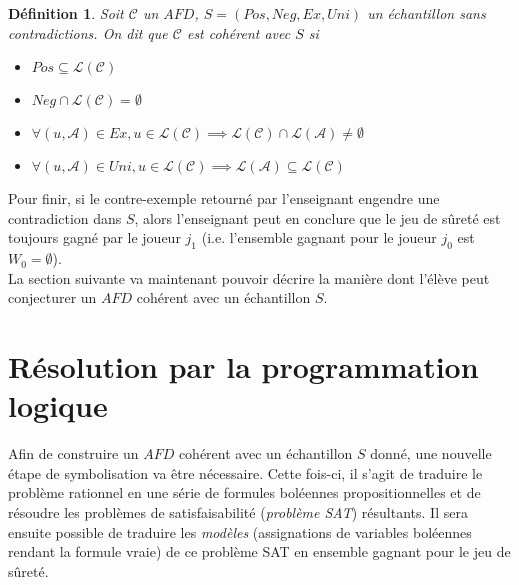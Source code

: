 \documentclass[12pt,a4paper,oneside,titlepage]{report}
\newtheorem{defi}{D\'efinition}[section]
\begin{document}
\begin{defi}
\label{consistency}
Soit $\mathcal{C}$ un $AFD$, $S=(Pos, Neg, Ex, Uni)$ un échantillon sans contradictions. On dit que $\mathcal{C}$ est \emph{cohérent} avec $S$ si
\begin{itemize}
\item $Pos\subseteq \mathcal{L}(\mathcal{C})$
\item $Neg\cap \mathcal{L}(\mathcal{C})=\emptyset$
\item $\forall (u,\mathcal{A})\in Ex, u\in\mathcal{L}(\mathcal{C})\implies  \mathcal{L}(\mathcal{C})\cap \mathcal{L}(\mathcal{A})\neq\emptyset$
\item $\forall (u,\mathcal{A})\in Uni, u\in\mathcal{L}(\mathcal{C})\implies  \mathcal{L}(\mathcal{A})\subseteq \mathcal{L}(\mathcal{C})$
\end{itemize}
\end{defi}
\noindent Pour finir, si le contre-exemple retourné par l'enseignant engendre une contradiction dans $S$, alors l'enseignant peut en conclure que le jeu de sûreté est toujours gagné par le joueur $j_1$ (i.e. l'ensemble gagnant pour le joueur $j_0$ est $W_0=\emptyset$).\\

\noindent La section suivante va maintenant pouvoir décrire la manière dont l'élève peut conjecturer un $AFD$ cohérent avec un échantillon $S$.
\section{Résolution par la programmation logique}\label{prolog}
Afin de construire un $AFD$ cohérent avec un échantillon $S$ donné, une nouvelle étape de symbolisation va être nécessaire. Cette fois-ci, il s'agit de traduire le problème rationnel en une série de formules boléennes propositionnelles et de résoudre les problèmes de satisfaisabilité (\emph{problème SAT}) résultants. Il sera ensuite possible de traduire les \emph{modèles} (assignations de variables boléennes rendant la formule vraie) de ce problème SAT en ensemble gagnant pour le jeu de sûreté.
\end{document}
